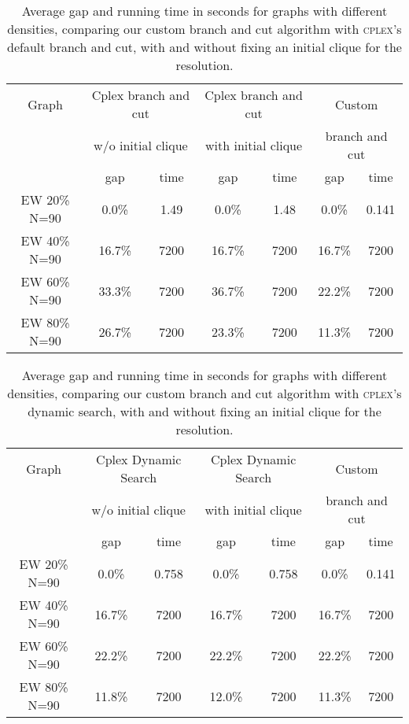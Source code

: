 \begin{table}[h]
\begin{tabular}{|c|cc|cc|cc|}
\hline
\multicolumn{1}{|c|}{Graph} & \multicolumn{2}{|c|}{Cplex branch and cut} & \multicolumn{2}{|c|}{Cplex branch and cut} & \multicolumn{2}{|c|}{Custom \PCP{}}
\\
\multicolumn{1}{|c|}{} & \multicolumn{2}{|c|}{w/o initial clique} & \multicolumn{2}{|c|}{with initial clique} & \multicolumn{2}{|c|}{branch and cut}
\\
\hline
& gap & time & gap & time & gap & time
\\
\hline
EW 20\% N=90 & 0.0\% & 1.49 & 0.0\% & 1.48 & 0.0\% & 0.141
\\
EW 40\% N=90 & 16.7\% & 7200 & 16.7\% & 7200 & 16.7\% & 7200
\\
EW 60\% N=90 & 33.3\% & 7200 & 36.7\% & 7200 & 22.2\% & 7200
\\
EW 80\% N=90 & 26.7\% & 7200 & 23.3\% & 7200 & 11.3\% & 7200
\\
\hline 
\end{tabular} 
\caption{Average gap and running time in seconds for graphs with different densities, comparing our custom \PCP{} branch and cut algorithm with \textsc{cplex}'s default branch and cut, with and without fixing an initial clique for the resolution.}
\label{table:final:cplexbnc}
\end{table}

\begin{table}[h]
\begin{tabular}{|c|cc|cc|cc|}
\hline
\multicolumn{1}{|c|}{Graph} & \multicolumn{2}{|c|}{Cplex Dynamic Search} & \multicolumn{2}{|c|}{Cplex Dynamic Search} & \multicolumn{2}{|c|}{Custom \PCP{}}
\\
\multicolumn{1}{|c|}{} & \multicolumn{2}{|c|}{w/o initial clique} & \multicolumn{2}{|c|}{with initial clique} & \multicolumn{2}{|c|}{branch and cut}
\\
\hline
& gap & time & gap & time & gap & time
\\
\hline
EW 20\% N=90 & 0.0\% & 0.758 & 0.0\% & 0.758 & 0.0\% & 0.141
\\
EW 40\% N=90 & 16.7\% & 7200 & 16.7\% & 7200 & 16.7\% & 7200
\\
EW 60\% N=90 & 22.2\% & 7200 & 22.2\% & 7200 & 22.2\% & 7200
\\
EW 80\% N=90 & 11.8\% & 7200 & 12.0\% & 7200 & 11.3\% & 7200
\\
\hline 
\end{tabular} 
\caption{Average gap and running time in seconds for graphs with different densities, comparing our custom \PCP{} branch and cut algorithm with \textsc{cplex}'s dynamic search, with and without fixing an initial clique for the resolution.}
\label{table:final:cplexdynamicsearch}
\end{table}

